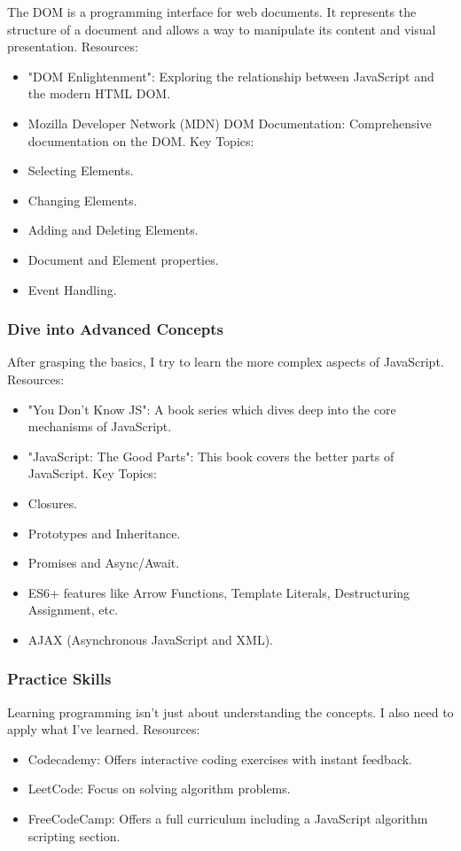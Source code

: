\documentclass{article}
\begin{document}
The DOM is a programming interface for web documents. It represents the structure of a document and allows a way to manipulate its content and visual presentation.
Resources:
\begin{itemize}
\item	"DOM Enlightenment": Exploring the relationship between JavaScript and the modern HTML DOM.
\item	Mozilla Developer Network (MDN) DOM Documentation: Comprehensive documentation on the DOM.
Key Topics:
\item	Selecting Elements.
\item	Changing Elements.
\item	Adding and Deleting Elements.
\item	Document and Element properties.
\item	Event Handling.
\end{itemize}

\subsubsection{Dive into Advanced Concepts}

After grasping the basics, I try to learn the more complex aspects of JavaScript.
Resources:
\begin{itemize}
\item	"You Don’t Know JS": A book series which dives deep into the core mechanisms of JavaScript.
\item	"JavaScript: The Good Parts": This book covers the better parts of JavaScript.
Key Topics:
\item	Closures.
\item	Prototypes and Inheritance.
\item	Promises and Async/Await.
\item	ES6+ features like Arrow Functions, Template Literals, Destructuring Assignment, etc.
\item	AJAX (Asynchronous JavaScript and XML).
\end{itemize}

\subsubsection{Practice Skills}

Learning programming isn't just about understanding the concepts. I also need to apply what I've learned.
Resources:
\begin{itemize}
\item	Codecademy: Offers interactive coding exercises with instant feedback.
\item	LeetCode: Focus on solving algorithm problems.
\item	FreeCodeCamp: Offers a full curriculum including a JavaScript algorithm scripting section.
\end{itemize}
\end{document}
